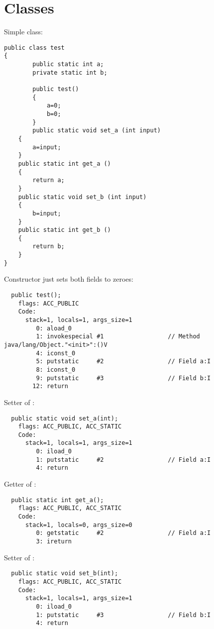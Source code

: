\section{Classes}

Simple class:

\begin{lstlisting}[caption=test.java]
public class test
{
        public static int a;
        private static int b;

        public test()
        {
            a=0;
            b=0;
        }
        public static void set_a (int input)
	{
		a=input;
	}
	public static int get_a ()
	{
		return a;
	}
	public static void set_b (int input)
	{
		b=input;
	}
	public static int get_b ()
	{
		return b;
	}
}
\end{lstlisting}

Constructor just sets both fields to zeroes:

\begin{lstlisting}
  public test();
    flags: ACC_PUBLIC
    Code:
      stack=1, locals=1, args_size=1
         0: aload_0       
         1: invokespecial #1                  // Method java/lang/Object."<init>":()V
         4: iconst_0      
         5: putstatic     #2                  // Field a:I
         8: iconst_0      
         9: putstatic     #3                  // Field b:I
        12: return        
\end{lstlisting}
        
Setter of :

\begin{lstlisting}
  public static void set_a(int);
    flags: ACC_PUBLIC, ACC_STATIC
    Code:
      stack=1, locals=1, args_size=1
         0: iload_0       
         1: putstatic     #2                  // Field a:I
         4: return        
\end{lstlisting}

Getter of :

\begin{lstlisting}
  public static int get_a();
    flags: ACC_PUBLIC, ACC_STATIC
    Code:
      stack=1, locals=0, args_size=0
         0: getstatic     #2                  // Field a:I
         3: ireturn       
\end{lstlisting}

Setter of :

\begin{lstlisting}
  public static void set_b(int);
    flags: ACC_PUBLIC, ACC_STATIC
    Code:
      stack=1, locals=1, args_size=1
         0: iload_0       
         1: putstatic     #3                  // Field b:I
         4: return        
\end{lstlisting}

